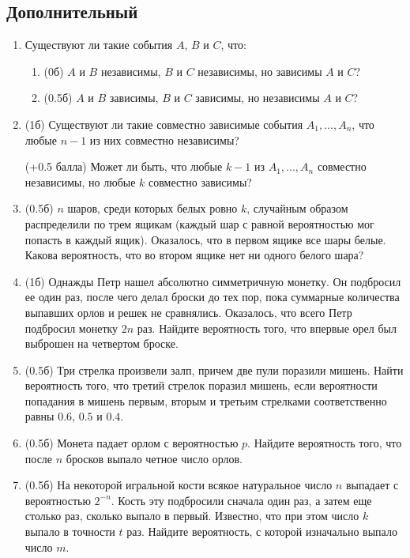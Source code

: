\documentclass[a4paper, 14pt]{extarticle}
\begin{document}
\subsection*{Дополнительный}
\begin{enumerate}
\item
Существуют ли такие события $A$, $B$ и $C$, что:
\begin{enumerate}
\item (0б)  $A$ и $B$ независимы, $B$ и $C$ независимы, но зависимы $A$ и $C$?
\item (0.5б) $A$ и $B$ зависимы, $B$ и $C$ зависимы, но независимы $A$ и $C$?
\end{enumerate}

\item (1б)
Существуют ли такие совместно зависимые события $A_1, ..., A_n$, что любые $n-1$ из них совместно независимы?

(+0.5 балла) Может ли быть, что любые $k-1$ из $A_1, ..., A_n$ совместно независимы, но любые $k$ совместно зависимы?

\item (0.5б)
$n$ шаров, среди которых белых ровно $k$, случайным образом распределили по трем ящикам (каждый шар с равной вероятностью мог попасть в каждый ящик). Оказалось, что в первом ящике все шары белые. Какова вероятность, что во втором ящике нет ни одного белого шара?

\item (1б)
Однажды Петр нашел абсолютно симметричную монетку. Он подбросил ее один раз, после чего делал броски до тех пор, пока суммарные количества выпавших орлов и решек не сравнялись. Оказалось, что всего Петр подбросил монетку $2n$ раз. Найдите вероятность того, что впервые орел был выброшен на четвертом броске.

\item (0.5б)
Три стрелка произвели залп, причем две пули поразили мишень. Найти вероятность того, что третий стрелок поразил мишень, если вероятности попадания в мишень первым, вторым и третьим стрелками соответственно равны $0.6$, $0.5$ и $0.4$.

\item (0.5б)
Монета падает орлом с вероятностью $p$. Найдите вероятность того, что после $n$ бросков выпало четное число орлов.

\item (0.5б)
На некоторой игральной кости всякое натуральное число $n$ выпадает с вероятностью $2^{-n}$. Кость эту подбросили сначала один раз, а затем еще столько раз, сколько выпало в первый. Известно, что при этом число $k$ выпало в точности $t$ раз. Найдите вероятность, с которой изначально выпало число $m$.


\end{enumerate}
\end{document}
